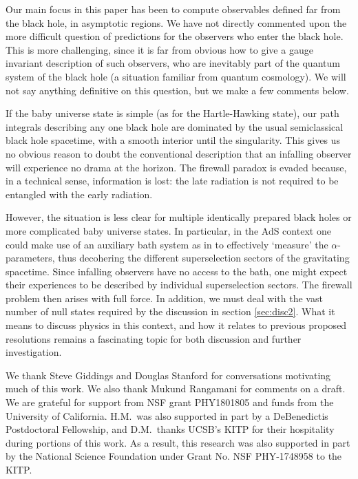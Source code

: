 \documentclass[letterpaper,12pt]{article}
\begin{document}
Our main focus in this paper has been to compute observables defined far from the black hole, in asymptotic regions. We have not directly commented upon the more difficult question of predictions for the observers who enter the black hole. This is more challenging, since it is far from obvious how to give a gauge invariant description of such observers, who are inevitably part of the quantum system of the black hole (a situation familiar from quantum cosmology). We will not say anything definitive on this question, but we make a few comments below.

If the baby universe state is simple (as for the Hartle-Hawking state), our path integrals describing any one black hole are dominated by the usual semiclassical black hole spacetime, with a smooth interior until the singularity. This gives us no obvious reason to doubt the conventional description that an infalling observer will experience no drama at the horizon. The firewall paradox \cite{Almheiri:2012rt,Almheiri:2013hfa} is evaded because, in a technical sense, information is lost: the late radiation is not required to be entangled with the early radiation.

However, the situation is less clear for multiple identically prepared black holes or more complicated baby universe states.  In particular, in the AdS context one could make use of an
auxiliary bath system as in \cite{Almheiri:2019psf} to effectively `measure' the $\alpha$-parameters, thus decohering the different superselection sectors of the gravitating spacetime.  Since infalling observers have no access to the bath, one might expect their experiences to be described by individual superselection sectors.  The firewall problem then arises with full force.  In addition, we must deal with the vast number of null states required by the discussion in section \ref{sec:disc2}. What it means to discuss physics in this context, and how it relates to previous proposed resolutions  remains a fascinating topic for both discussion and further investigation.


\acknowledgments

We thank Steve Giddings and Douglas Stanford for conversations motivating much of this work. We also thank Mukund Rangamani for comments on a draft. We are grateful for support from NSF grant PHY1801805 and funds from the University of California. H.M.~was also supported in part by a DeBenedictis Postdoctoral Fellowship, and D.M.~thanks UCSB's KITP for their hospitality during portions of this work.  As a result, this research was also supported in part by the National Science Foundation under Grant No. NSF PHY-1748958 to the KITP.
\end{document}
